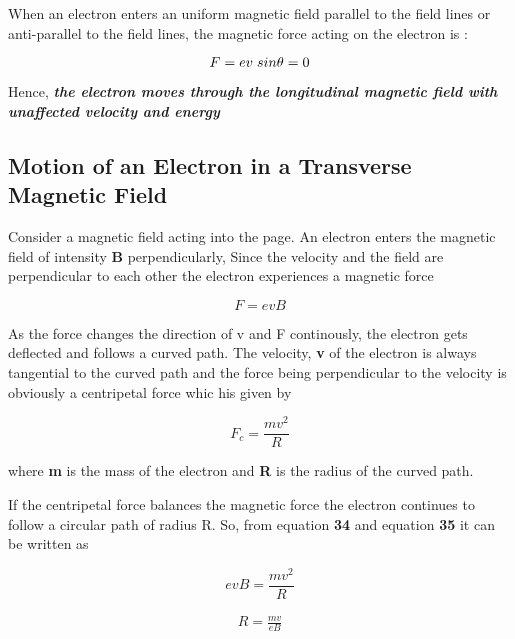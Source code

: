 \documentclass[a4paper,20pt,twoside]{report}
\begin{document}
	When an electron enters an uniform magnetic field parallel to the field lines or anti-parallel to the field lines, the magnetic force acting on the electron is : 
	
	\begin{equation}
	F = ev\hspace{1mm}sin\theta = 0
	\end{equation}
	
	Hence, \textbf{\textit{the electron moves through the longitudinal magnetic field with unaffected velocity and energy}}
	
	\vspace{10mm}
	\subsection{Motion of an Electron in a Transverse Magnetic Field}
	
	Consider a magnetic field acting into the page. An electron enters the magnetic field of intensity \textbf{B} perpendicularly, Since the velocity and the field are perpendicular to each other the electron experiences a magnetic force 
	
	\begin{equation}
	F = evB
	\end{equation}
	
	\vspace{4mm}
	As the force changes the direction of v and F continously, the electron gets deflected and follows a curved path. The velocity, \textbf{v} of the electron is always tangential to the curved path and the force being perpendicular to the velocity is obviously a centripetal force whic his given by 
	
	\begin{equation}
	F_c = \frac{mv^2}{R}
	\end{equation}
	\vspace{4mm}
	
	where \textbf{m} is the mass of the electron and \textbf{R} is the radius of the curved path.
	
	If the centripetal force balances the magnetic force the electron continues to follow a circular path of radius R. So, from equation \textbf{34} and equation \textbf{35} it can be written as 
	
	\begin{equation}
	evB = \frac{mv^2}{R}
	\end{equation}
	
	\begin{eqnarray}
	R = \frac{mv}{eB}
	\end{eqnarray}
	
\end{document}
